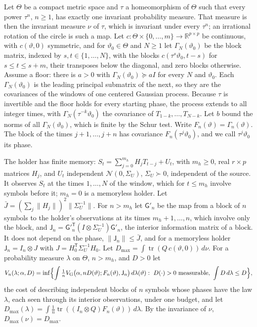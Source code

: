 \documentclass[11pt,onecolumn]{IEEEtran}
\newcommand{\R}{\mathbb{R}}
\newcommand{\tr}{\operatorname{tr}}
\newcommand{\VG}{V_{\mathrm G}}
\begin{document}
Let $\Theta$ be a compact metric space and $\tau$ a homeomorphism of
$\Theta$ such that every power $\tau^n$, $n\ge1$, has exactly one
invariant probability measure. That measure is then the invariant
measure $\nu$ of $\tau$, which is invariant under every $\tau^n$; an
irrational rotation of the circle is such a map. Let
$c:\Theta\times\{0,\dots,m\}\to\R^{p\times p}$ be continuous, with
$c(\vartheta,0)$ symmetric, and for $\vartheta_0\in\Theta$ and $N\ge1$ let
$\Gamma_N(\vartheta_0)$ be the block matrix, indexed by
$s,t\in\{1,\dots,N\}$, with the blocks $c(\tau^s\vartheta_0,t-s)$ for
$s\le t\le s+m$, their transposes below the diagonal, and zero blocks
otherwise. Assume a floor: there is $a>0$ with
$\Gamma_N(\vartheta_0)\succeq aI$ for every $N$ and $\vartheta_0$. Each
$\Gamma_N(\vartheta_0)$ is the leading principal submatrix of the next, so
they are the covariances of the windows of one centered Gaussian
process. Because $\tau$ is invertible and the floor holds for every
starting phase, the process extends to all integer times, with
$\Gamma_N(\tau^{-k}\vartheta_0)$ the covariance of $T_{1-k},\dots,T_{N-k}$. Let
$b$ bound the norms of all $\Gamma_N(\vartheta_0)$, which is finite by the
Schur test. Write $F_n(\vartheta)=\Gamma_n(\vartheta)$. The block of the times
$j+1,\dots,j+n$ has covariance $F_n(\tau^j\vartheta_0)$, and we call
$\tau^j\vartheta_0$ its phase.

The holder has finite memory: $S_t=\sum_{j=0}^{m_h}H_jT_{t-j}+U_t$, with
$m_h\ge0$, real $r\times p$ matrices $H_j$, and $U_t$ independent
$\mathcal N(0,\Sigma_U)$, $\Sigma_U\succ0$, independent of the source. It
observes $S_t$ at the times $1,\dots,N$ of the window, which for $t\le m_h$
involve symbols before it; $m_h=0$ is a memoryless holder. Let
$\bar J=(\sum_j\|H_j\|)^2\|\Sigma_U^{-1}\|$. For $n>m_h$ let $\mathsf G'_n$ be the
map from a block of $n$ symbols to the holder's observations at its
times $m_h+1,\dots,n$, which involve only the block, and
$\mathsf J_n=\mathsf G'^{\mathsf T}_n(I\otimes\Sigma_U^{-1})\mathsf G'_n$, the
interior information matrix of a block. It does not depend on the
phase, $\|\mathsf J_n\|\le\bar J$, and for a memoryless holder
$\mathsf J_n=I_n\otimes J$ with $J=H_0^{\mathsf T}\Sigma_U^{-1}H_0$. Let
$D_{\max}=\int\tr(Q\,c(\vartheta,0))\,d\nu$. For a probability measure
$\lambda$ on $\Theta$, $n>m_h$, and $D>0$ let
\[
V_n(\lambda;\alpha,D)=\inf\Bigl\{\int\tfrac1n\VG\bigl(\alpha,nD(\vartheta);F_n(\vartheta),\mathsf J_n\bigr)\,d\lambda(\vartheta):\ D(\cdot)>0\text{ measurable},\ \int D\,d\lambda\le D\Bigr\},
\]
the cost of describing independent blocks of $n$ symbols whose phases
have the law $\lambda$, each seen through its interior observations,
under one budget, and let
$D_{\max}(\lambda)=\int\tfrac1n\tr((I_n\otimes Q)F_n(\vartheta))\,d\lambda$. By the
invariance of $\nu$, $D_{\max}(\nu)=D_{\max}$.
\end{document}
